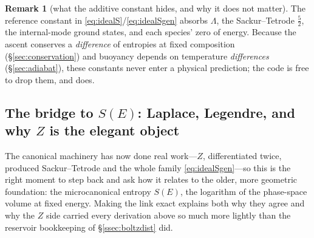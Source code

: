 \documentclass[11pt,a4paper]{article}
\theoremstyle{definition}
\newtheorem{remark}{Remark}
\begin{document}
\begin{remark}[what the additive constant hides, and why it does not matter]
The reference constant in \eqref{eq:idealS}/\eqref{eq:idealSgen} absorbs
$\Lambda$, the Sackur--Tetrode $\tfrac52$, the internal-mode ground states, and
each species' zero of energy. Because the ascent conserves a \emph{difference}
of entropies at fixed composition (\S\ref{sec:conservation}) and buoyancy
depends on temperature \emph{differences} (\S\ref{sec:adiabat}), these constants
never enter a physical prediction; the code is free to drop them, and does.
\end{remark}

\subsection{The bridge to \texorpdfstring{$S(E)$}{S(E)}: Laplace, Legendre, and
why \texorpdfstring{$Z$}{Z} is the elegant object}\label{ssec:bridge}

The canonical machinery has now done real work---$Z$, differentiated twice,
produced Sackur--Tetrode and the whole family
\eqref{eq:idealSgen}---so this is the right moment to step back and ask how it
relates to the older, more geometric foundation: the microcanonical entropy
$S(E)$, the logarithm of the phase-space volume at fixed
energy. Making the link exact explains
both why they agree and why the $Z$ side carried every derivation above so much
more lightly than the reservoir bookkeeping of \S\ref{ssec:boltzdist} did.
\end{document}

